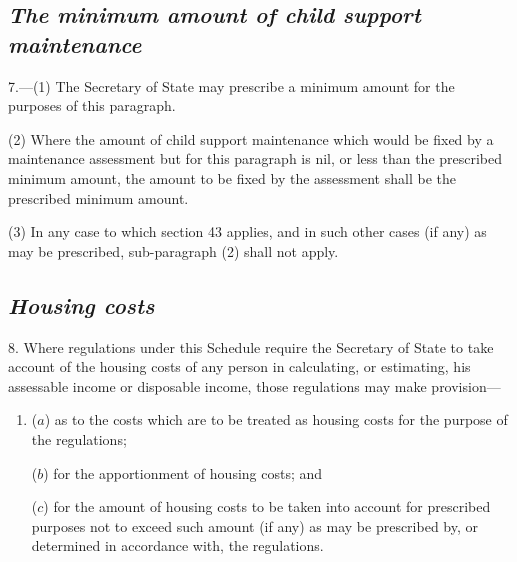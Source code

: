 \documentclass[12pt,a4paper]{article}
\begin{document}

\subsection*{\itshape The minimum amount of child support maintenance}

7.---(1) The Secretary of State may prescribe a minimum amount for the purposes of this paragraph.

(2) Where the amount of child support maintenance which would be fixed by a maintenance assessment but for this paragraph is nil, or less than the prescribed minimum amount, the amount to be fixed by the assessment shall be the prescribed minimum amount.

(3) In any case to which section 43 applies, and in such other cases (if any) as may be prescribed, sub-paragraph (2)  shall not apply.

\subsection*{\itshape Housing costs}

8. Where regulations under this Schedule require 
the Secretary of State  %
to take account of the housing costs of any person in calculating, or estimating, his assessable income or disposable income, those regulations may make provision—
\begin{enumerate}\item[]
($a$) as to the costs which are to be treated as housing costs for the purpose of the regulations;

($b$) for the apportionment of housing costs; and

($c$) for the amount of housing costs to be taken into account for prescribed purposes not to exceed such amount (if any) as may be prescribed by, or determined in accordance with, the regulations.
\end{enumerate}
\end{document}

